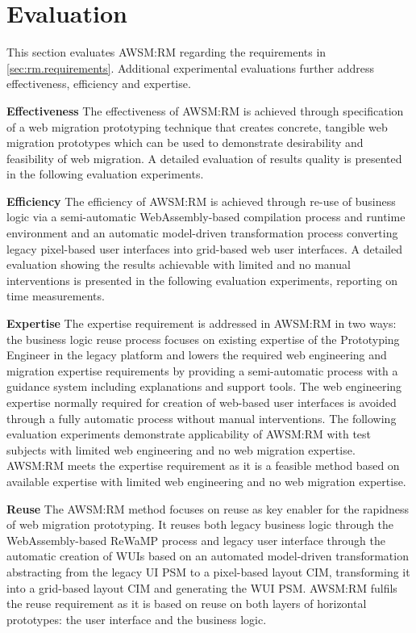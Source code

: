 \hypertarget{sec:rm.evaluation}{%
\section{Evaluation}\label{sec:rm.evaluation}}

This section evaluates AWSM:RM regarding the requirements in \cref{sec:rm.requirements}.
Additional experimental evaluations further address effectiveness, efficiency and expertise.

\textbf{Effectiveness} The effectiveness of AWSM:RM is achieved through specification of a web migration prototyping technique that creates concrete, tangible web migration prototypes which can be used to demonstrate desirability and feasibility of web migration.
A detailed evaluation of results quality is presented in the following evaluation experiments.

\textbf{Efficiency} The efficiency of AWSM:RM is achieved through re-use of business logic via a semi-automatic WebAssembly-based compilation process and runtime environment and an automatic model-driven transformation process converting legacy pixel-based user interfaces into grid-based web user interfaces.
A detailed evaluation showing the results achievable with limited and no manual interventions is presented in the following evaluation experiments, reporting on time measurements.

\textbf{Expertise} The expertise requirement is addressed in AWSM:RM in two ways: the business logic reuse process focuses on existing expertise of the Prototyping Engineer in the legacy platform and lowers the required web engineering and migration expertise requirements by providing a semi-automatic process with a guidance system including explanations and support tools.
The web engineering expertise normally required for creation of web-based user interfaces is avoided through a fully automatic process without manual interventions.
The following evaluation experiments demonstrate applicability of AWSM:RM with test subjects with limited web engineering and no web migration expertise.
AWSM:RM meets the expertise requirement as it is a feasible method based on available expertise with limited web engineering and no web migration expertise.

\textbf{Reuse} The AWSM:RM method focuses on reuse as key enabler for the rapidness of web migration prototyping.
It reuses both legacy business logic through the WebAssembly-based ReWaMP process and legacy user interface through the automatic creation of WUIs based on an automated model-driven transformation abstracting from the legacy UI PSM to a pixel-based layout CIM, transforming it into a grid-based layout CIM and generating the WUI PSM.
AWSM:RM fulfils the reuse requirement as it is based on reuse on both layers of horizontal prototypes: the user interface and the business logic.

